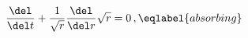 \begin{equation}
\frac{\del}{\del t} + \frac{1}{\sqrt{r}}\frac{\del}{\del r}\sqrt{r}=0\,,
\eqlabel{absorbing}
\end{equation}

